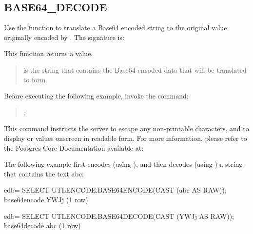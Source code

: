 \documentclass[letterpaper,10pt,english,openany,oneside]{sphinxmanual}
\begin{document}
\subsection{BASE64\_DECODE}
\label{\detokenize{base64_decode::doc}}\label{\detokenize{base64_decode:base64-decode}}
Use the  function to translate a Base64 encoded string to
the original value originally encoded by . The signature
is:
\begin{quote}

\end{quote}

This function returns a  value.


\begin{quote}

 is the string that contains the Base64 encoded data that will be
translated to  form.
\end{quote}


Before executing the following example, invoke the command:
\begin{quote}

;
\end{quote}

This command instructs the server to escape any non-printable
characters, and to display  or  values onscreen in readable
form. For more information, please refer to the Postgres Core
Documentation available at:


The following example first encodes (using ), and then
decodes (using ) a string that contains the text abc:

%
\begin{sphinxVerbatim}[commandchars=\\\{\}]
edb=\PYGZsh{} SELECT UTL\PYGZus{}ENCODE.BASE64\PYGZus{}ENCODE(CAST (\PYGZsq{}abc\PYGZsq{} AS RAW));
 base64\PYGZus{}encode
\PYGZhy{}\PYGZhy{}\PYGZhy{}\PYGZhy{}\PYGZhy{}\PYGZhy{}\PYGZhy{}\PYGZhy{}\PYGZhy{}\PYGZhy{}\PYGZhy{}\PYGZhy{}\PYGZhy{}\PYGZhy{}\PYGZhy{}
 YWJj
(1 row)

edb=\PYGZsh{} SELECT UTL\PYGZus{}ENCODE.BASE64\PYGZus{}DECODE(CAST (\PYGZsq{}YWJj\PYGZsq{} AS RAW));
 base64\PYGZus{}decode
\PYGZhy{}\PYGZhy{}\PYGZhy{}\PYGZhy{}\PYGZhy{}\PYGZhy{}\PYGZhy{}\PYGZhy{}\PYGZhy{}\PYGZhy{}\PYGZhy{}\PYGZhy{}\PYGZhy{}\PYGZhy{}\PYGZhy{}
 abc
(1 row)
\end{sphinxVerbatim}
\end{document}
